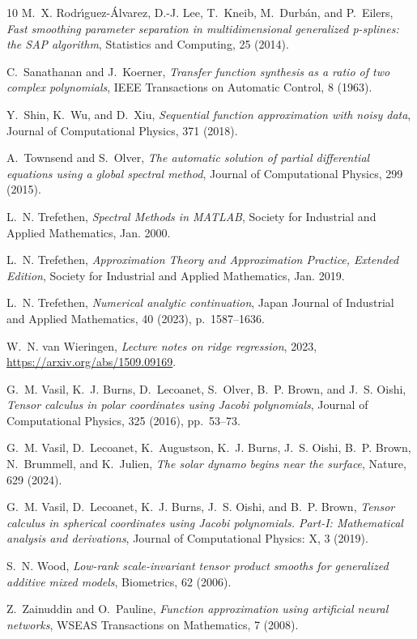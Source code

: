 \documentclass{article}
\begin{document}
\begin{thebibliography}{10}
{\sc M.~X. Rodr{\'{\i}}guez-{\'{A}}lvarez, D.-J. Lee, T.~Kneib, M.~Durb{\'{a}}n, and P.~Eilers}, {\em Fast smoothing parameter separation in multidimensional generalized p-splines: the {SAP} algorithm}, Statistics and Computing, 25 (2014).

{\sc C.~Sanathanan and J.~Koerner}, {\em Transfer function synthesis as a ratio of two complex polynomials}, {IEEE} Transactions on Automatic Control, 8 (1963).

{\sc Y.~Shin, K.~Wu, and D.~Xiu}, {\em Sequential function approximation with noisy data}, Journal of Computational Physics, 371 (2018).

{\sc A.~Townsend and S.~Olver}, {\em The automatic solution of partial differential equations using a global spectral method}, Journal of Computational Physics, 299 (2015).

{\sc L.~N. Trefethen}, {\em Spectral Methods in MATLAB}, Society for Industrial and Applied Mathematics, Jan. 2000.

{\sc L.~N. Trefethen}, {\em Approximation Theory and Approximation Practice, Extended Edition}, Society for Industrial and Applied Mathematics, Jan. 2019.

{\sc L.~N. Trefethen}, {\em Numerical analytic continuation}, Japan Journal of Industrial and Applied Mathematics, 40 (2023), p.~1587–1636.

{\sc W.~N. van Wieringen}, {\em Lecture notes on ridge regression}, 2023, \url{https://arxiv.org/abs/1509.09169}.

{\sc G.~M. Vasil, K.~J. Burns, D.~Lecoanet, S.~Olver, B.~P. Brown, and J.~S. Oishi}, {\em Tensor calculus in polar coordinates using {J}acobi polynomials}, Journal of Computational Physics, 325 (2016), pp.~53--73.

{\sc G.~M. Vasil, D.~Lecoanet, K.~Augustson, K.~J. Burns, J.~S. Oishi, B.~P. Brown, N.~Brummell, and K.~Julien}, {\em The solar dynamo begins near the surface}, Nature, 629 (2024).

{\sc G.~M. Vasil, D.~Lecoanet, K.~J. Burns, J.~S. Oishi, and B.~P. Brown}, {\em Tensor calculus in spherical coordinates using {J}acobi polynomials. {P}art-{I}: {M}athematical analysis and derivations}, Journal of Computational Physics: X, 3 (2019).

{\sc S.~N. Wood}, {\em Low-rank scale-invariant tensor product smooths for generalized additive mixed models}, Biometrics, 62 (2006).

{\sc Z.~Zainuddin and O.~Pauline}, {\em Function approximation using artificial neural networks}, WSEAS Transactions on Mathematics, 7 (2008).

\end{thebibliography}
\end{document}
